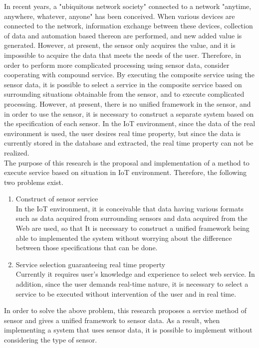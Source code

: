 \documentclass{kuisthesis}			%
\begin{document}
\begin{eabstract}				%
In recent years, a "ubiquitous network society" connected to a network "anytime, anywhere, whatever, anyone" has been conceived. When various devices are connected to the network, information exchange between these devices, collection of data and automation based thereon are performed, and new added value is generated. However, at present, the sensor only acquires the value, and it is impossible to acquire the data that meets the needs of the user. Therefore, in order to perform more complicated processing using sensor data, consider cooperating with compound service. By executing the composite service using the sensor data, it is possible to select a service in the composite service based on surrounding situations obtainable from the sensor, and to execute complicated processing. However, at present, there is no unified framework in the sensor, and in order to use the sensor, it is necessary to construct a separate system based on the specification of each sensor. In the IoT environment, since the data of the real environment is used, the user desires real time property, but since the data is currently stored in the database and extracted, the real time property can not be realized.\\
The purpose of this research is the proposal and implementation of a method to execute service based on situation in IoT environment. Therefore, the following two problems exist.
\begin{enumerate}
\item Construct of sensor service\\
In the IoT environment, it is conceivable that data having various formats such as data acquired from surrounding sensors and data acquired from the Web are used, so that It is necessary to construct a unified framework being able to implemented the system without worrying about the difference between those specifications that can be done.
\item Service selection guaranteeing real time property\\
Currently it requires user's knowledge and experience to select web service. In addition, since the user demands real-time nature, it is necessary to select a service to be executed without intervention of the user and in real time.
\end{enumerate}
In order to solve the above problem, this research proposes a service method of sensor and gives a unified framework to sensor data. As a result, when implementing a system that uses sensor data, it is possible to implement without considering the type of sensor.\\

\end{eabstract}
\end{document}
